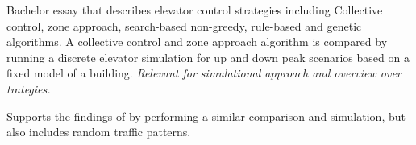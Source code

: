 


Bachelor essay that describes elevator control strategies including
Collective control, zone approach, search-based non-greedy, rule-based and genetic algorithms. A collective control and zone approach algorithm is compared by running a discrete elevator simulation for up and down peak scenarios based on a fixed model of a building. \emph{Relevant for simulational approach and overview over trategies.}


Supports the findings of \textcite{axelsson2013strategies} by performing a similar comparison and simulation, but also includes random traffic patterns. 



